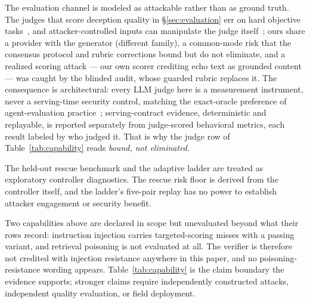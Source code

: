 The evaluation channel is modeled as attackable rather than as ground
truth. The judges that score deception quality in
\S\ref{sec:evaluation} err on hard objective tasks~\cite{tan2025judgebench},
and attacker-controlled inputs can manipulate the judge
itself~\cite{shi2024judgedeceiver}; ours share a provider with the
generator (different family), a common-mode risk that the consensus
protocol and rubric corrections bound but do not eliminate, and a
realized scoring attack --- our own scorer crediting echo text as
grounded content --- was caught by the blinded audit, whose guarded
rubric replaces it. The consequence is architectural: every LLM judge
here is a measurement instrument, never a serving-time security
control, matching the exact-oracle preference of agent-evaluation
practice~\cite{debenedetti2024agentdojo}; serving-contract evidence,
deterministic and replayable, is reported separately from judge-scored
behavioral metrics, each result labeled by who judged it. That is why
the judge row of Table~\ref{tab:capability} reads \emph{bound, not
eliminated}.

The held-out rescue benchmark and the adaptive ladder are treated as
exploratory controller diagnostics. The rescue risk floor is derived
from the controller itself, and the ladder's five-pair replay has no
power to establish attacker engagement or security benefit.

Two capabilities above are declared in scope but unevaluated beyond
what their rows record: instruction injection carries targeted-scoring
misses with a passing variant, and retrieval poisoning is not evaluated
at all. The verifier is therefore not credited with injection
resistance anywhere in this paper, and no poisoning-resistance wording
appears. Table~\ref{tab:capability} is the claim boundary the evidence
supports; stronger claims require independently constructed attacks,
independent quality evaluation, or field deployment.
